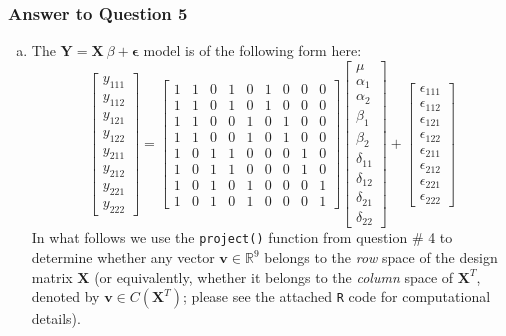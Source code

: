 \documentclass[paper=a4, fontsize=11pt]{scrartcl} %
\newcommand{\matX}{\mathbf{X}}
\newcommand{\matY}{\mathbf{Y}}
\begin{document}
\bigskip
\subsubsection*{Answer to Question 5}


\begin{enumerate}[(a)]
\item The $\matY = \matX \  \beta + \mathbf{\epsilon}$ model is of the following form here:
$$
\begin{bmatrix} 
y_{1 1 1} \\ y_{1 1 2}\\ y_{1 2 1} \\ y_{1 2 2} \\ y_{2 1 1} \\y_{2 1 2} \\ y_{2 2 1} \\ y_{2 2 2} 
\end{bmatrix}
=
\begin{bmatrix} 1 & 1 & 0 & 1 & 0 & 1 & 0 & 0 & 0 \\1 & 1 & 0 & 1 & 0 & 1 & 0 & 0 & 0\\1 & 1 & 0 & 0 & 1 & 0 & 1 & 0 & 0\\1 & 1 & 0 & 0 & 1  & 0 & 1 & 0 & 0\\1 & 0 & 1 & 1 & 0 & 0 & 0 & 1 & 0\\1 & 0 & 1 & 1 & 0 & 0 & 0 & 1 & 0\\1 & 0 & 1 & 0 & 1 & 0 & 0 & 0 & 1\\1 & 0 & 1 & 0 & 1 & 0 & 0 & 0 & 1\end{bmatrix}
\begin{bmatrix} 
\mu \\ \alpha_1\\ \alpha_2 \\ \beta_1 \\ \beta_2 \\ \delta_{11} \\ \delta_{12} \\ \delta_{21} \\ \delta_{22} 
\end{bmatrix}
+ 
\begin{bmatrix} 
\epsilon_{1 1 1} \\ \epsilon_{1 1 2}\\ \epsilon_{1 2 1} \\ \epsilon_{1 2 2} \\ \epsilon_{2 1 1} \\ \epsilon_{2 1 2} \\ \epsilon_{2 2 1} \\ \epsilon_{2 2 2} 
\end{bmatrix}
$$
In what follows we use the \texttt{project()} function from question \# 4 to determine whether any vector $\mathbf{v} \in \mathbb{R}^9$ belongs to the \emph{row} space of the design matrix $\matX$ (or equivalently, whether it belongs to the \emph{column} space of $\matX^{T}$, denoted by $ \mathbf{v} \in C(\matX^T)$; please see the attached \texttt{R} code for computational details).
\bigskip


\end{enumerate}
\end{document}

